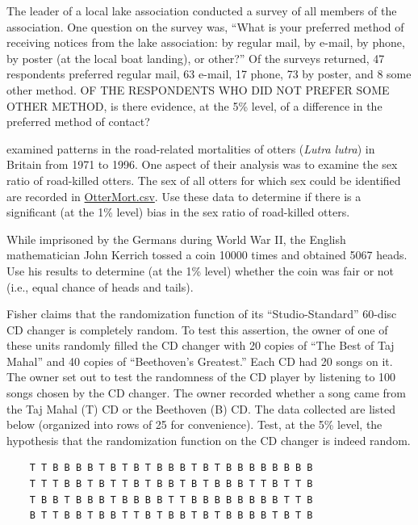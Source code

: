 \documentclass[10pt,openany]{book}\usepackage[]{graphicx}\usepackage[]{color}
\begin{document}
\newpage
\begin{exsection}
  \item \label{revex:ChiGOFPref1} \rhw{} The leader of a local lake association conducted a survey of all members of the association.  One question on the survey was, ``What is your preferred method of receiving notices from the lake association: by regular mail, by e-mail, by phone, by poster (at the local boat landing), or other?''  Of the surveys returned, 47 respondents preferred regular mail, 63 e-mail, 17 phone, 73 by poster, and 8 some other method.  OF THE RESPONDENTS WHO DID NOT PREFER SOME OTHER METHOD, is there evidence, at the 5\% level, of a difference in the preferred method of contact? 

  \item \label{revex:ChiGOFOtterMortality} \rhw{} \cite{Philcoxetal1999} examined patterns in the road-related mortalities of otters (\emph{Lutra lutra}) in Britain from 1971 to 1996.  One aspect of their analysis was to examine the sex ratio of road-killed otters.  The sex of all otters for which sex could be identified are recorded in \href{https://raw.githubusercontent.com/droglenc/NCData/master/OtterMort.csv}{OtterMort.csv}.  Use these data to determine if there is a significant (at the 1\% level) bias in the sex ratio of road-killed otters. 

  \item \label{revex:ChiGOFCoin} \rhw{} While imprisoned by the Germans during World War II, the English mathematician John Kerrich tossed a coin 10000 times and obtained 5067 heads.  Use his results to determine (at the 1\% level) whether the coin was fair or not (i.e., equal chance of heads and tails). 

  \item \label{revex:ChiGOFCD} \rhw{} Fisher claims that the randomization function of its ``Studio-Standard'' 60-disc CD changer is completely random.  To test this assertion, the owner of one of these units randomly filled the CD changer with 20 copies of ``The Best of Taj Mahal'' and 40 copies of ``Beethoven's Greatest.''  Each CD had 20 songs on it.  The owner set out to test the randomness of the CD player by listening to 100 songs chosen by the CD changer.  The owner recorded whether a song came from the Taj Mahal (T) CD or the Beethoven (B) CD.  The data collected are listed below (organized into rows of 25 for convenience).  Test, at the 5\% level, the hypothesis that the randomization function on the CD changer is indeed random. 
    \begin{Verbatim}
    T T B B B B T B T B T B B B T B T B B B B B B B B
    T T T B B T B T T B T B B T B T B B B T T B T T B
    T B B T B B B T B B B B T T B B B B B B B B T T B
    B T T B B T B B T T B T B B T B T B B B B T B T B
    \end{Verbatim}


\end{exsection}
\end{document}
